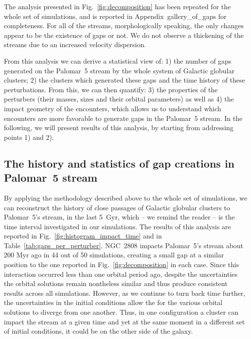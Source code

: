 \documentclass{aa}
\begin{document}
    The analysis presented in Fig.~\ref{fig:decomposition} has been repeated for the whole set of simulations, and is reported in Appendix~gallery\_of\_gaps for completeness. For all of the streams, morphologically speaking, the only changes appear to be the existence of gaps or not. We do not observe a thickening of the streams due to an increased velocity dispersion. 
    
    From this analysis we can derive a statistical view of: 1) the number of gaps generated on the Palomar~5 stream by the whole system of Galactic globular clusters; 2) the clusters which generated these gaps and the time history of these perturbations. From this, we can then quantify: 3) the properties of the perturbers (their masses, sizes and their orbital parameters) as well as 4) the impact geometry of the encounters, which allows us to understand which encounters are more favorable to generate gaps in the Palomar~5 stream. In the following, we will present results of this analysis, by starting from addressing points 1) and 2).





  \subsection{The history and statistics of gap creations in Palomar~5 stream}\label{sect:history}
  

      


    By applying the methodology described above to the whole set of simulations, we can reconstruct the history of close passages of Galactic globular clusters to Palomar~5's stream, in the last 5~Gyr, which -- we remind the reader -- is the time interval investigated in our simulations. The results of this analysis are reported in Fig.~\ref{fig:histogram_impact_time} and in Table~\ref{tab:gaps_per_perturber}. NGC~2808 impacts Palomar~5's stream about 200 Myr ago in 44 out of 50 simulations, creating a small gap at a similar position to the one reported in Fig.~\ref{fig:decomposition} in each case. Since this interaction occurred less than one orbital period ago, despite the uncertainties the orbital solutions remain nontheless similar and thus produce consistent results across all simulations. However, as we continue to turn back time further, the uncertainties in the initial conditions allow the for the various orbital solutions to diverge from one another. Thus, in one configuration a cluster can impact the stream at a given time and yet at the same moment in a different set of initial conditions, it could be on the other side of the galaxy.
    
\end{document}
